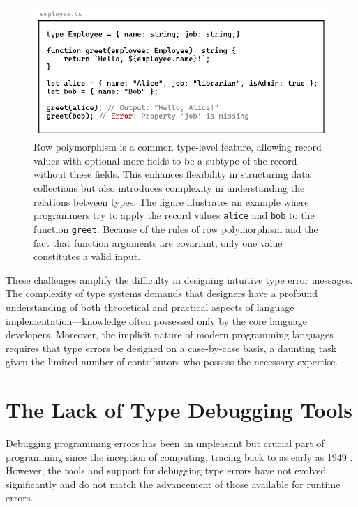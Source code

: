 \begin{figure}[]
  \includegraphics[width=\linewidth]{RowPolymorphism.pdf}
  \caption[An example of a correct usage and a wrong usage of row polymorphism in TypeScript]{
    \label{fig:row-polymophism}
Row polymorphism is a common type-level feature, allowing record values with optional more fields to be a subtype of the record without these fields. This enhances flexibility in structuring data collections but also introduces complexity in understanding the relations between types. The figure illustrates an example where programmers try to apply the record values \texttt{alice} and \texttt{bob} to the function \texttt{greet}. Because of the rules of row polymorphism and the fact that function arguments are covariant, only one value constitutes a valid input. 
    }
\end{figure}

These challenges amplify the difficulty in designing intuitive type error messages. The complexity of type systems demands that designers have a profound understanding of both theoretical and practical aspects of language implementation—knowledge often possessed only by the core language developers. Moreover, the implicit nature of modern programming languages requires that type errors be designed on a case-by-case basis, a daunting task given the limited number of contributors who possess the necessary expertise.

\section{The Lack of Type Debugging Tools}

Debugging programming errors has been an unpleasant but crucial part of programming since the inception of computing, tracing back to as early as 1949 \cite{Campbell-Kelly1992-rn}. However, the tools and support for debugging type errors have not evolved significantly and do not match the advancement of those available for runtime errors.

